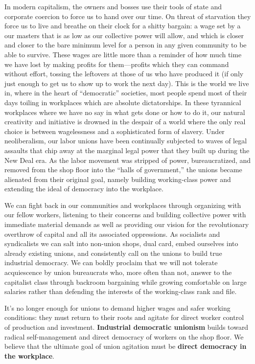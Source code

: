 \documentclass[10pt]{memoir}
\begin{document}
In modern capitalism, the owners and bosses use their tools of state and
corporate coercion to force us to hand over our time. On threat of
starvation they force us to live and breathe on their clock for a shitty
bargain: a wage set by a our masters that is as low as our collective
power will allow, and which is closer and closer to the bare minimum
level for a person in any given community to be able to survive. These
wages are little more than a reminder of how much time we have lost by
making profits for them---profits which they can command without effort,
tossing the leftovers at those of us who have produced it (if only just
enough to get us to show up to work the next day). This is the world we
live in, where in the heart of ``democratic'' societies, most people
spend most of their days toiling in workplaces which are absolute
dictatorships. In these tyrannical workplaces where we have no say in
what gets done or how to do it, our natural creativity and initiative is
drowned in the despair of a world where the only real choice is between
wagelessness and a sophisticated form of slavery. Under neoliberalism,
our labor unions have been continually subjected to waves of legal
assaults that chip away at the marginal legal power that they built up
during the New Deal era. As the labor movement was stripped of power,
bureaucratized, and removed from the shop floor into the ``halls of
government,'' the unions became alienated from their original goal,
namely building working-class power and extending the ideal of democracy
into the workplace.

We can fight back in our communities and workplaces through organizing
with our fellow workers, listening to their concerns and building
collective power with immediate material demands as well as providing
our vision for the revolutionary overthrow of capital and all its
associated oppressions. As socialists and syndicalists we can salt into
non-union shops, dual card, embed ourselves into already existing
unions, and consistently call on the unions to build true industrial
democracy. We can boldly proclaim that we will not tolerate acquiescence
by union bureaucrats who, more often than not, answer to the capitalist
class through backroom bargaining while growing comfortable on large
salaries rather than defending the interests of the working-class rank
and file.

It's no longer enough for unions to demand higher wages and safer
working conditions: they must return to their roots and agitate for
direct worker control of production and investment. \textbf{Industrial
democratic unionism} builds toward radical self-management and direct
democracy of workers on the shop floor. We believe that the ultimate
goal of union agitation must be \textbf{direct democracy in the
workplace}.
\end{document}
